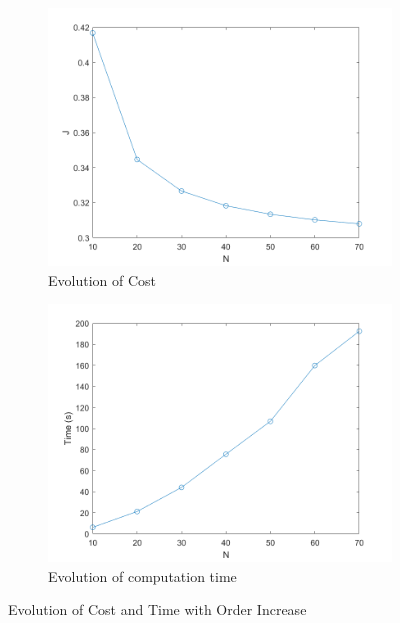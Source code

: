 \begin{figure}[h!]
\centering
\begin{subfigure}[b]{0.5\textwidth}
    \centering
    \includegraphics[width=\textwidth]{Images/results/costevolution.png}
    \caption{Evolution of Cost}
    \label{fig:evolutionofcostprogressiveN}
\end{subfigure}%
\begin{subfigure}[b]{0.5\textwidth}
    \centering
    \includegraphics[width=\textwidth]{Images/results/timeevolutionincreasingN.png}
    \caption{Evolution of computation time}
    \label{fig:evolutionoftimeprogressiveN}
\end{subfigure}
\caption{Evolution of Cost and Time with Order Increase}
\label{fig:progressiveNinfo}
\end{figure}


